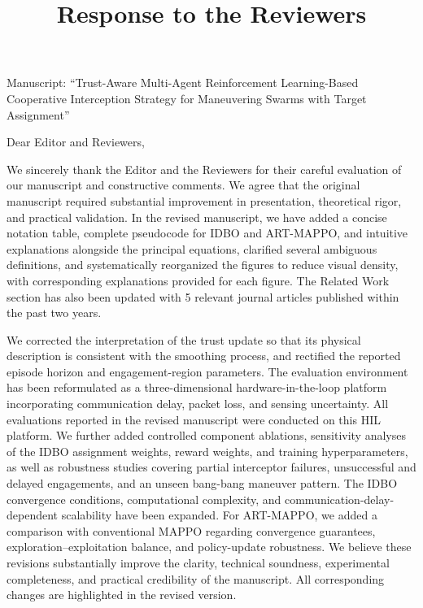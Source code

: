\documentclass[11pt]{article}
\title{\vspace{-1.5em}Response to the Reviewers}
\date{}
\begin{document}
\maketitle
\vspace{-3em}
\begin{center}\small
Manuscript: ``Trust-Aware Multi-Agent Reinforcement Learning-Based Cooperative
Interception Strategy for Maneuvering Swarms with Target Assignment''
\end{center}
\bigskip

\noindent Dear Editor and Reviewers,

\medskip
\noindent We sincerely thank the Editor and the Reviewers for their careful
evaluation of our manuscript and constructive comments. We agree that the
original manuscript required substantial improvement in presentation,
theoretical rigor, and practical validation. In the revised manuscript, we
have added a concise notation table, complete pseudocode for IDBO and
ART-MAPPO, and intuitive explanations alongside the principal equations,
clarified several ambiguous definitions, and systematically reorganized the
figures to reduce visual density, with corresponding explanations provided
for each figure. The Related Work section has also been updated with 5
relevant journal articles published within the past two years. 

\medskip
\noindent We corrected the interpretation of the trust update so that its physical
description is consistent with the smoothing process, and rectified the
reported episode horizon and engagement-region parameters. 
The evaluation environment has been reformulated as a three-dimensional
hardware-in-the-loop platform incorporating communication delay, packet loss,
and sensing uncertainty. All evaluations reported in the revised manuscript
were conducted on this HIL platform.
We further added controlled component ablations, sensitivity
analyses of the IDBO assignment weights, reward weights, and training
hyperparameters, as well as robustness studies covering partial interceptor
failures, unsuccessful and delayed engagements, and an unseen bang-bang
maneuver pattern. The IDBO convergence conditions, computational complexity,
and communication-delay-dependent scalability have been expanded. For
ART-MAPPO, we added a comparison with conventional MAPPO regarding
convergence guarantees, exploration--exploitation balance, and policy-update
robustness. We believe
these revisions substantially improve the clarity, technical soundness,
experimental completeness, and practical credibility of the manuscript. All
corresponding changes are highlighted in the revised version.
\end{document}
